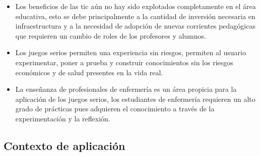\begin{itemize}

    \item Los beneficios de las \gls{tic} aún no hay sido explotados completamente 
    en el área educativa, esto se debe principalmente a la cantidad de inversión 
    necesaria en infraestructura y a la necesidad de adopción de nuevas corrientes 
    pedagógicas que requieren un cambio de roles de los profesores y alumnos\cite{unesco2013tics}.

\item Los juegos serios permiten una experiencia sin riesgos, permiten  al usuario 
	experimentar, poner a prueba y construir conocimientos sin los riesgos económicos 
	y de salud presentes en la vida real\cite{sg:aoverview}.

    
\item La enseñanza de profesionales de enfermería es un área propicia para la 
	aplicación de los juegos serios, los estudiantes de enfermería requieren un alto 
	grado de prácticas pues adquieren el conocimiento a través de la experimentación 
	y la reflexión\cite{humphreys2013developing}.


    
\end{itemize}    
    
\subsection{Contexto de aplicación}

